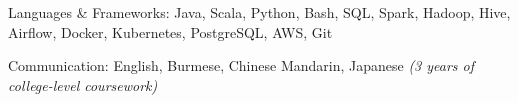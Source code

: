 

\begin{cvskills}

  \cvskill
  {Languages \& Frameworks:} %
  {Java, Scala, Python, Bash, SQL, Spark, Hadoop, Hive, Airflow, Docker, Kubernetes, PostgreSQL, AWS, Git} %

  \cvskill
  {Communication:} %
  {English, Burmese, Chinese Mandarin, Japanese \bodyfontlight\emph{(3 years of college-level coursework)}} %

\end{cvskills}

